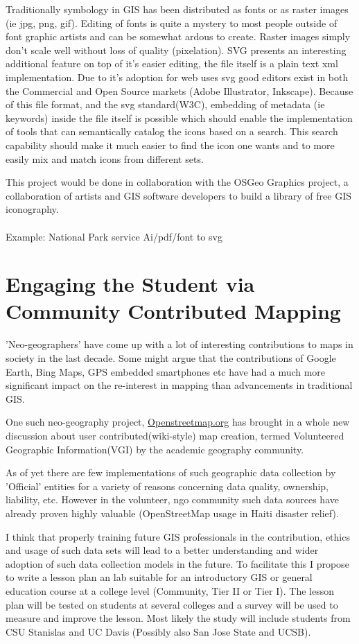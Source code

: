 \documentclass[12pt,letterpaper]{article}
\begin{document}
Traditionally symbology in GIS has been distributed as fonts or as raster images (ie jpg, png, gif). Editing of fonts is quite a mystery to most people outside of font graphic artists and can be somewhat ardous to create. Raster images simply don't scale well without loss of quality (pixelation). SVG presents an interesting additional feature on top of it's easier editing, the file itself is a plain text xml implementation. Due to it's adoption for web uses svg good editors exist in both the Commercial and Open Source markets (Adobe Illustrator, Inkscape). Because of this file format, and the svg standard(W3C), embedding of metadata (ie keywords) inside the file itself is possible which should enable the implementation of tools that can semantically catalog the icons based on a search. This search capability should make it much easier to find the icon one wants and to more easily mix and match icons from different sets.

This project would be done in collaboration with the OSGeo Graphics project, a collaboration of artists and GIS software developers to build a library of free GIS iconography.
\\
\\ Example: National Park service Ai/pdf/font to svg

\section{Engaging the Student via Community Contributed Mapping}
'Neo-geographers' have come up with a lot of interesting contributions to maps in society in the last decade. Some might argue that the contributions of Google Earth, Bing Maps, GPS embedded smartphones etc have had a much more significant impact on the re-interest in mapping than advancements in traditional GIS.

One such neo-geography project, \href{http://openstreetmap.org}{Openstreetmap.org} has brought in a whole new discussion about user contributed(wiki-style) map creation, termed Volunteered Geographic Information(VGI) by the academic geography community.

As of yet there are few implementations of such geographic data collection by 'Official' entities for a variety of reasons concerning data quality, ownership, liability, etc. However in the volunteer, ngo community such data sources have already proven highly valuable (OpenStreetMap usage in Haiti disaster relief).

I think that properly training future GIS professionals in the contribution, ethics and usage of such data sets will lead to a better understanding and wider adoption of such data collection models in the future. To facilitate this I propose to write a lesson plan an lab suitable for an introductory GIS or general education course at a college level (Community, Tier II or Tier I). The lesson plan will be tested on students at several colleges and a survey will be used to measure and improve the lesson. Most likely the study will include students from CSU Stanislas and UC Davis (Possibly also San Jose State and UCSB).
\end{document}
